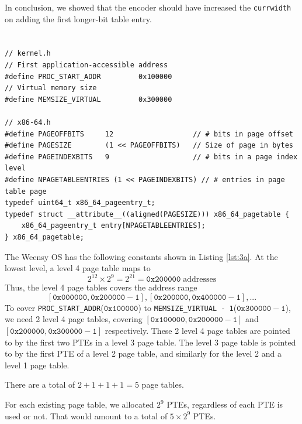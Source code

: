 \documentclass[12pt]{article}
\begin{document}
In conclusion, we showed that the encoder should have increased the \texttt{currwidth} on adding the first longer-bit table entry.


\newpage
\section{}

\subsection{}

\begin{lstlisting}[style=C++, label={lst:3a}, caption={Weensy OS defined constants},captionpos=b]
// kernel.h
// First application-accessible address
#define PROC_START_ADDR         0x100000
// Virtual memory size
#define MEMSIZE_VIRTUAL         0x300000

// x86-64.h
#define PAGEOFFBITS     12                   // # bits in page offset
#define PAGESIZE        (1 << PAGEOFFBITS)   // Size of page in bytes
#define PAGEINDEXBITS   9                    // # bits in a page index level
#define NPAGETABLEENTRIES (1 << PAGEINDEXBITS) // # entries in page table page
typedef uint64_t x86_64_pageentry_t;
typedef struct __attribute__((aligned(PAGESIZE))) x86_64_pagetable {
    x86_64_pageentry_t entry[NPAGETABLEENTRIES];
} x86_64_pagetable;
\end{lstlisting}

The Weensy OS has the following constants shown in Listing \ref{lst:3a}. At the lowest level, a level 4 page table maps to 
$$2^{12} \times 2^{9} = 2^{21} = \mathtt{0x200000} \; \text{addresses}$$
Thus, the level 4 page tables covers the address range 
$$[\mathtt{0x000000},\mathtt{0x200000 - 1}], [\mathtt{0x200000},\mathtt{0x400000 - 1}], ...$$
To cover \texttt{PROC\_START\_ADDR}($\mathtt{0x100000}$) to \texttt{MEMSIZE\_VIRTUAL - 1}($\mathtt{0x300000 - 1}$), we need 2 level 4 page tables, covering $[\mathtt{0x100000},\mathtt{0x200000 - 1}]$ and $[\mathtt{0x200000},\mathtt{0x300000 - 1}]$ respectively. These 2 level 4 page tables are pointed to by the first two PTEs in a level 3 page table. The level 3 page table is pointed to by the first PTE of a level 2 page table, and similarly for the level 2 and a level 1 page table.

There are a total of $2 + 1 + 1 + 1 = 5$ page tables. 

For each existing page table, we allocated $2^9$ PTEs, regardless of each PTE is used or not. That would amount to a total of $5 \times 2^9$ PTEs.
\end{document}
